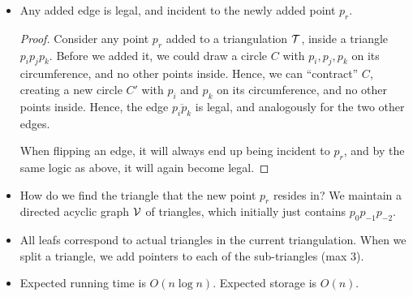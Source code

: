 \begin{itemize}
\item Any added edge is legal, and incident to the newly added point $p_r$.
  \begin{proof}
    Consider any point $p_r$ added to a triangulation $\mathcal{T}$, inside a
    triangle $p_ip_jp_k$. Before we added it, we could draw a circle
    $C$ with $p_i,p_j,p_k$ on its circumference, and no other points
    inside. Hence, we can ``contract'' $C$, creating a new circle $C'$
    with $p_i$ and $p_k$ on its circumference, and no other points
    inside. Hence, the edge $\overline{p_ip_k}$ is legal, and
    analogously for the two other edges.

    When flipping an edge, it will always end up being incident to
    $p_r$, and by the same logic as above, it will again become legal.
  \end{proof}

\item How do we find the triangle that the new point $p_r$ resides in?
  We maintain a directed acyclic graph $\mathcal{V}$ of triangles, which
  initially just contains $p_0p_{-1}p_{-2}$.

\item All leafs correspond to actual triangles in the current
  triangulation. When we split a triangle, we add pointers to each of
  the sub-triangles (max 3).

\item Expected running time is $O(n \log n)$. Expected storage is
  $O(n)$.
\end{itemize}

